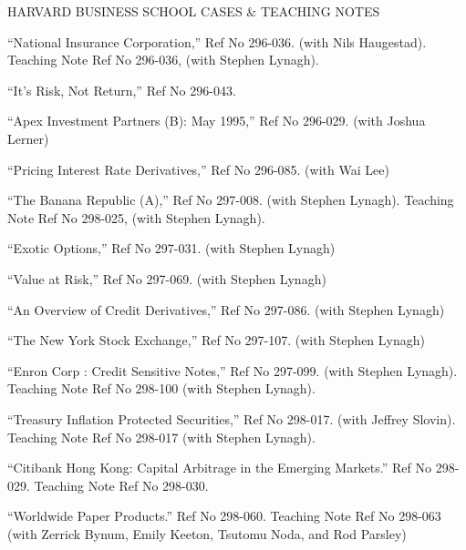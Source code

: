 \documentclass{article}
\begin{document}
\begin{description}
\item[HARVARD BUSINESS SCHOOL CASES \& TEACHING NOTES] \mbox{}
\end{description}

\begin{etaremune}
\setlength\itemsep{-0.3em}

\item ``National Insurance Corporation,'' Ref No  296-036.  (with Nils
Haugestad). Teaching Note Ref No 296-036, (with Stephen Lynagh). 
 
\item ``It's Risk, Not Return,'' Ref No  296-043.

\item ``Apex Investment Partners (B): May 1995,'' 
Ref No  296-029. (with Joshua Lerner)

\item ``Pricing Interest Rate Derivatives,'' Ref No 296-085.
(with Wai Lee)

\item ``The Banana Republic (A),'' Ref No  297-008. (with Stephen
Lynagh).  Teaching Note Ref No 298-025, (with Stephen Lynagh).

\item ``Exotic Options,'' Ref No 297-031.
(with Stephen Lynagh)

\item ``Value at Risk,'' Ref No 297-069.
(with Stephen Lynagh)

\item ``An Overview of Credit Derivatives,'' Ref No 297-086.
(with Stephen Lynagh)

\item ``The New York Stock Exchange,'' Ref No 297-107.
(with Stephen Lynagh)

\item ``Enron Corp : Credit Sensitive Notes,'' Ref No 297-099.
(with Stephen Lynagh). Teaching Note Ref No 298-100 (with Stephen Lynagh).

\item ``Treasury Inflation Protected Securities,'' Ref No 298-017. (with
Jeffrey Slovin). Teaching Note Ref No 298-017 (with Stephen Lynagh).  

\item ``Citibank Hong Kong: Capital Arbitrage in the Emerging Markets.''
Ref No 298-029. Teaching Note Ref No 298-030.

\item ``Worldwide Paper Products.'' Ref No 298-060. 
Teaching Note Ref No 298-063 (with Zerrick Bynum, Emily Keeton,
Tsutomu Noda, and Rod Parsley)
 
\end{etaremune}
\end{document}
